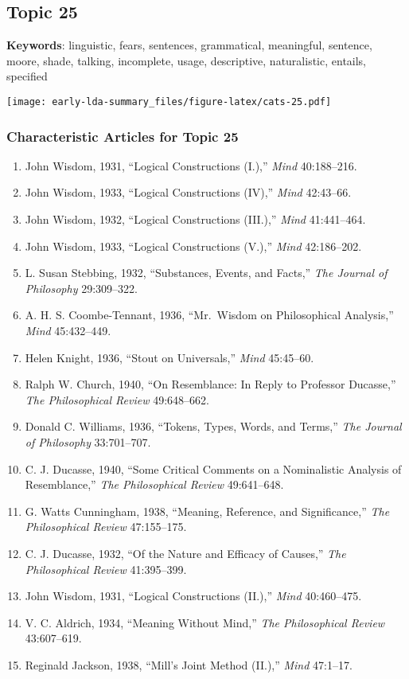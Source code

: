 \documentclass[
]{article}
\begin{document}
\newpage

\hypertarget{topic-25}{%
\subsection{Topic 25}\label{topic-25}}

\textbf{Keywords}: linguistic, fears, sentences, grammatical,
meaningful, sentence, moore, shade, talking, incomplete, usage,
descriptive, naturalistic, entails, specified

\texttt{[image: early-lda-summary\_files/figure-latex/cats-25.pdf]}
\newpage 

\hypertarget{characteristic-articles-for-topic-25}{%
\subsubsection{Characteristic Articles for Topic
25}\label{characteristic-articles-for-topic-25}}

\begin{enumerate}
\def\labelenumi{\arabic{enumi}.}
\item
  John Wisdom, 1931, ``Logical Constructions (I.),'' \emph{Mind}
  40:188--216.
\item
  John Wisdom, 1933, ``Logical Constructions (IV),'' \emph{Mind}
  42:43--66.
\item
  John Wisdom, 1932, ``Logical Constructions (III.),'' \emph{Mind}
  41:441--464.
\item
  John Wisdom, 1933, ``Logical Constructions (V.),'' \emph{Mind}
  42:186--202.
\item
  L. Susan Stebbing, 1932, ``Substances, Events, and Facts,'' \emph{The
  Journal of Philosophy} 29:309--322.
\item
  A. H. S. Coombe-Tennant, 1936, ``Mr.~Wisdom on Philosophical
  Analysis,'' \emph{Mind} 45:432--449.
\item
  Helen Knight, 1936, ``Stout on Universals,'' \emph{Mind} 45:45--60.
\item
  Ralph W. Church, 1940, ``On Resemblance: In Reply to Professor
  Ducasse,'' \emph{The Philosophical Review} 49:648--662.
\item
  Donald C. Williams, 1936, ``Tokens, Types, Words, and Terms,''
  \emph{The Journal of Philosophy} 33:701--707.
\item
  C. J. Ducasse, 1940, ``Some Critical Comments on a Nominalistic
  Analysis of Resemblance,'' \emph{The Philosophical Review}
  49:641--648.
\item
  G. Watts Cunningham, 1938, ``Meaning, Reference, and Significance,''
  \emph{The Philosophical Review} 47:155--175.
\item
  C. J. Ducasse, 1932, ``Of the Nature and Efficacy of Causes,''
  \emph{The Philosophical Review} 41:395--399.
\item
  John Wisdom, 1931, ``Logical Constructions (II.),'' \emph{Mind}
  40:460--475.
\item
  V. C. Aldrich, 1934, ``Meaning Without Mind,'' \emph{The Philosophical
  Review} 43:607--619.
\item
  Reginald Jackson, 1938, ``Mill's Joint Method (II.),'' \emph{Mind}
  47:1--17.
\end{enumerate}

\newpage 
\newpage
\end{document}

